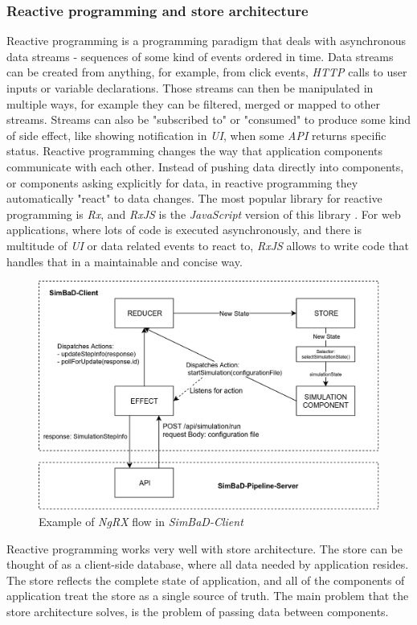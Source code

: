 \subsubsection{Reactive programming and store architecture}
Reactive programming is a programming paradigm that deals with asynchronous data streams - sequences of some kind of events ordered in time. Data streams can be created from anything, for example, from click events, \textit{HTTP} calls to user inputs or variable declarations. Those streams can then be manipulated in multiple ways, for example they can be filtered, merged or mapped to other streams. Streams can also be "subscribed to" or "consumed" to produce some kind of side effect, like showing notification in \textit{UI}, when some \textit{API} returns specific status. Reactive programming changes the way that application components communicate with each other. Instead of pushing data directly into components, or components asking explicitly for data, in reactive programming they automatically "react" to data changes. The most popular library for reactive programming is \textit{Rx}, and \textit{RxJS} is the \textit{JavaScript} version of this library \cite{RxJSSource}. For web applications, where lots of code is executed asynchronously, and there is multitude of \textit{UI} or data related events to react to, \textit{RxJS} allows to write code that handles that in a maintainable and concise way.
\begin{figure}[h!]
	\centering
		\includegraphics[width=0.9\linewidth]{diagrams/ngrx.png}
	\caption{Example of \textit{NgRX} flow in \textit{SimBaD-Client}}
	\label{fig:ngrx}
\end{figure}
Reactive programming works very well with store architecture. The store can be thought of as a client-side database, where all data needed by application resides. The store reflects the complete state of application, and all of the components of application treat the store as a single source of truth. The main problem that the store architecture solves, is the problem of passing data between  components.
